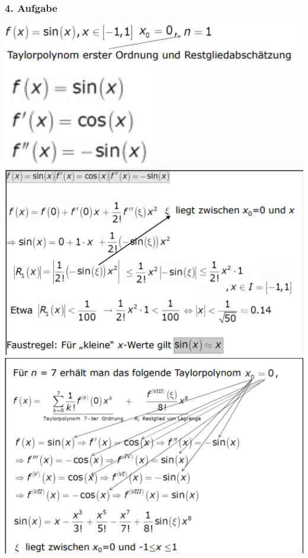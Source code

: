 \documentclass[12pt,a4paper]{article}
\begin{document}
\subsubsection{4. Aufgabe}
\includegraphics[width=1\textwidth]{Bilder/S1/22.png}\\
\includegraphics[width=0.5\textwidth]{Bilder/S1/23.png}\\
\includegraphics[width=1\textwidth]{Bilder/S1/24.png}\\
\includegraphics[width=1\textwidth]{Bilder/S1/25.png}\\
\end{document}
